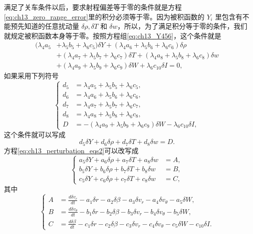 满足了关车条件以后，要求射程偏差等于零的条件就是方程\eqref{eq:ch13_zero_range_error}里的积分必须等于零。因为被积函数的 $Y_i$ 里包含有不能预先知道的任意扰动量 $\delta \rho, \delta T$ 和 $\delta w$，所以，为了满足积分等于零的条件，我们就规定被积函数本身等于零。按照方程组\eqref{eq:ch13_Y456}，这个条件就是
\begin{align*}
(\lambda_4 a_5 &+ \lambda_5 b_5 + \lambda_6 c_5) \delta Y + (\lambda_4 a_6 + \lambda_5 b_6 + \lambda_6 c_6) \delta \rho \\
& + (\lambda_4 a_7 + \lambda_5 b_7 + \lambda_6 c_7) \delta T + (\lambda_4 a_8 + \lambda_5 b_8 + \lambda_6 c_8) \delta w \\
& + (\lambda_4 a_9 + \lambda_5 b_9 + \lambda_6 c_9) \delta W + \lambda_6 c_{10} \delta I = 0,
\end{align*}
如果采用下列符号
\begin{equation}\label{eq:ch13_d5_d6_d7_d8}
\left\{
\begin{aligned}
d_5 &= \lambda_4 a_5 + \lambda_5 b_5 + \lambda_6 c_5, \\
d_6 &= \lambda_4 a_6 + \lambda_5 b_6 + \lambda_6 c_6, \\
d_7 &= \lambda_4 a_7 + \lambda_5 b_7 + \lambda_6 c_7, \\
d_8 &= \lambda_4 a_8 + \lambda_5 b_8 + \lambda_6 c_8, \\
D &= -(\lambda_4 a_9 + \lambda_5 b_9 + \lambda_6 c_9) \delta W - \lambda_6 c_{10} \delta I,
\end{aligned}
\right.
\end{equation}
这个条件就可以写成
\begin{equation}\label{eq:ch13_this_condition}
d_5 \delta Y + d_6 \delta \rho + d_7 \delta T + d_8 \delta w = D.
\end{equation}
方程\eqref{eq:ch13_perturbation_eqs2}可以改写成
\begin{equation}\label{eq:ch13_disturbance_relations}
\left\{
\begin{aligned}
a_5 \delta Y + a_6 \delta \rho + a_7 \delta T + a_8 \delta w &= A, \\
b_5 \delta Y + b_6 \delta \rho + b_7 \delta T + b_8 \delta w &= B, \\
c_5 \delta Y + c_6 \delta \rho + c_7 \delta T + c_8 \delta w &= C,
\end{aligned}
\right.
\end{equation}
其中
\begin{equation}\label{eq:ch13_ABC}
\left\{
\begin{aligned}
A &= \frac{d\delta v_r}{dt} - a_1 \delta r - a_2 \delta \beta - a_3 \delta v_r - a_4 \delta v_\theta - a_5 \delta W, \\
B &= \frac{d\delta v_\theta}{dt} - b_1 \delta r - b_2 \delta \beta - b_3 \delta v_r - b_4 \delta v_\theta - b_5 \delta W, \\
C &= \frac{d\delta \beta}{dt} - c_1 \delta r - c_2 \delta \beta - c_3 \delta v_r - c_4 \delta v_\theta - c_5 \delta W - c_{10} \delta I.
\end{aligned}
\right.
\end{equation}
